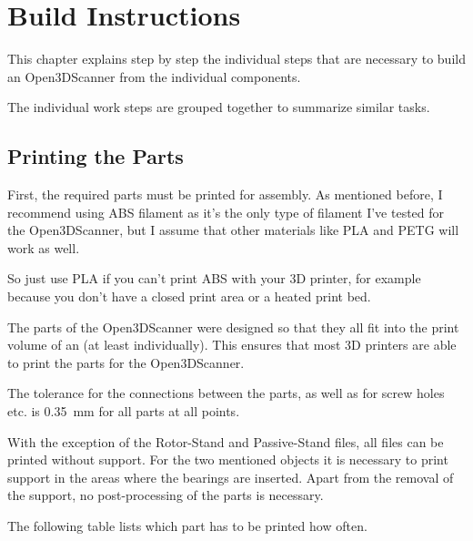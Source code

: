 \chapter{Build Instructions}%
\label{c:build}%
This chapter explains step by step the individual steps that are necessary to build an Open3DScanner from the individual components.%

The individual work steps are grouped together to summarize similar tasks.%

\section{Printing the Parts}%
First, the required parts must be printed for assembly. As mentioned before, I recommend using ABS filament as it's the only type of filament I've tested for the Open3DScanner, but I assume that other materials like PLA and PETG will work as well.%

So just use PLA if you can't print ABS with your 3D printer, for example because you don't have a closed print area or a heated print bed.%

The parts of the Open3DScanner were designed so that they all fit into the print volume of an  (at least individually). This ensures that most 3D printers are able to print the parts for the Open3DScanner.%

The tolerance for the connections between the parts, as well as for screw holes etc. is \SI{0.35}{\milli\meter} for all parts at all points.%

With the exception of the Rotor-Stand and Passive-Stand files, all files can be printed without support. For the two mentioned objects it is necessary to print support in the areas where the bearings are inserted. Apart from the removal of the support, no post-processing of the parts is necessary.%

%

The following table lists which part has to be printed how often.%


